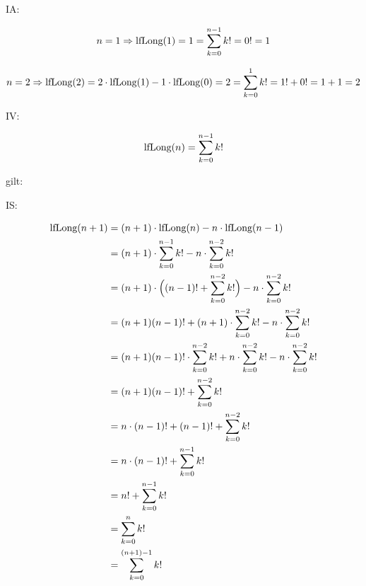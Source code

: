 \documentclass{lehramt-informatik-aufgabe}
\begin{document}
\begin{enumerate}
\begin{liAntwort}

IA:

\begin{displaymath}
n=1 \Rightarrow
\text{lfLong}(1) =
1 =
\sum^{n-1}_{k=0}k! =
0! =
1
\end{displaymath}

\begin{displaymath}
n=2 \Rightarrow
\text{lfLong}(2) =
2 \cdot \text{lfLong}(1) - 1 \cdot \text{lfLong}(0) =
2 =
\sum^{1}_{k=0}k! =
1! + 0! =
1 + 1 =
2
\end{displaymath}

IV:

\begin{displaymath}
\text{lfLong}(n) = \sum^{n-1}_{k=0}k!
\end{displaymath}

gilt:

IS:

\begin{equation}
\begin{split}
\text{lfLong}(n+1) & = (n+1) \cdot \text{lfLong}(n) - n \cdot \text{lfLong}(n-1) \\
& = (n+1) \cdot \sum^{n-1}_{k=0}k! - n \cdot \sum^{n-2}_{k=0}k! \\
& = (n+1) \cdot \Big((n-1)! + \sum^{n-2}_{k=0}k!\Big) - n \cdot \sum^{n-2}_{k=0}k! \\
& = (n+1)(n-1)! + (n+1) \cdot \sum^{n-2}_{k=0}k! - n \cdot \sum^{n-2}_{k=0}k! \\
& = (n+1)(n-1)! \cdot \sum^{n-2}_{k=0}k! + n \cdot \sum^{n-2}_{k=0}k! - n \cdot \sum^{n-2}_{k=0}k! \\
& = (n+1)(n-1)! + \sum^{n-2}_{k=0}k! \\
& = n \cdot (n-1)! + (n-1)! + \sum^{n-2}_{k=0}k! \\
& = n \cdot (n-1)! + \sum^{n-1}_{k=0}k! \\
& = n! + \sum^{n-1}_{k=0}k! \\
& = \sum^{n}_{k=0}k! \\
& = \sum^{(n+1)-1}_{k=0}k!
\end{split}
\end{equation}
\end{liAntwort}
\end{enumerate}
\end{document}
